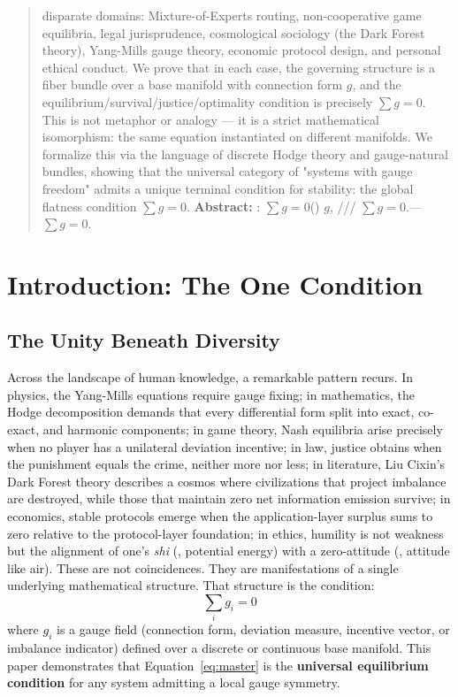 \documentclass[11pt,a4paper]{article}
\begin{document}
\begin{CJK}{UTF8}{gbsn}
{\begin{abstract}
disparate domains: Mixture-of-Experts routing, non-cooperative game equilibria, legal
jurisprudence, cosmological sociology (the Dark Forest theory), Yang-Mills gauge theory,
economic protocol design, and personal ethical conduct. We prove that in each case, the
governing structure is a fiber bundle over a base manifold with connection form $g$,
and the equilibrium/survival/justice/optimality condition is precisely $\sum g = 0$.
This is not metaphor or analogy --- it is a strict mathematical isomorphism: the same
equation instantiated on different manifolds. We formalize this via the language of
discrete Hodge theory and gauge-natural bundles, showing that the universal category
of "systems with gauge freedom" admits a unique terminal condition for stability:
the global flatness condition $\sum g = 0$.
\vspace{0.5cm}
\noindent
\textbf{Abstract: } :  $\sum g = 0$()
$g$, /// $\sum g = 0$.---
 $\sum g = 0$.
\end{abstract}
\newpage
\tableofcontents
\newpage
\section{Introduction: The One Condition}
\label{sec:intro}
\subsection{The Unity Beneath Diversity}
\begin{CJK}{UTF8}{gbsn}
Across the landscape of human knowledge, a remarkable pattern recurs. In physics,
the Yang-Mills equations require gauge fixing; in mathematics, the Hodge decomposition
demands that every differential form split into exact, co-exact, and harmonic components;
in game theory, Nash equilibria arise precisely when no player has a unilateral deviation
incentive; in law, justice obtains when the punishment equals the crime, neither more
nor less; in literature, Liu Cixin's Dark Forest theory describes a cosmos where
civilizations that project imbalance are destroyed, while those that maintain zero
net information emission survive; in economics, stable protocols emerge when the
application-layer surplus sums to zero relative to the protocol-layer foundation;
in ethics, humility is not weakness but the alignment of one's \textit{shi} (, potential
energy) with a zero-attitude (\textit{}, attitude like air).
These are not coincidences. They are manifestations of a single underlying mathematical
structure. That structure is the condition:
\begin{equation}
\boxed{\sum_{i} g_i = 0}
\label{eq:master}
\end{equation}
where $g_i$ is a gauge field (connection form, deviation measure, incentive vector,
or imbalance indicator) defined over a discrete or continuous base manifold. This paper
demonstrates that Equation~\ref{eq:master} is the \textbf{universal equilibrium condition}
for any system admitting a local gauge symmetry.

\end{CJK}}
\end{CJK}
\end{document}
